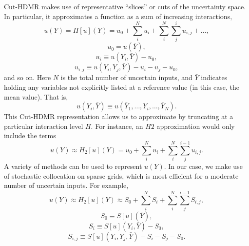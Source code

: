 \documentclass[11pt]{article}
\begin{document}
Cut-HDMR makes use of representative ``slices'' or cuts of the uncertainty space.  In particular, it approximates a function as a sum of increasing interactions,
\begin{equation}
u(Y)= H[u](Y)=u_0 + \sum_i^N u_i + \sum_i^N\sum_j^i u_{i,j}+...,
\end{equation}
\begin{equation}
u_0=u(\bar Y),
\end{equation}
\begin{equation}
u_i\equiv u(Y_i,\bar Y) - u_0,
\end{equation}
\begin{equation}
u_{i,j}\equiv u(Y_i,Y_j,\bar Y) - u_i - u_j - u_0,
\end{equation}
and so on.  Here $N$ is the total number of uncertain inputs, and $\bar Y$ indicates holding any variables not explicitly listed at a reference value (in this case, the mean value).  That is,
\begin{equation}
u(Y_i,\bar Y) \equiv u(\bar Y_1,\ldots,Y_i,\ldots,\bar Y_N).
\end{equation}
This Cut-HDMR representation allows us to approximate by truncating at a particular interaction level $H$.  For instance, an $H2$ approximation would only include the terms
\begin{equation}
u(Y)\approx H_2[u](Y) = u_0 + \sum_i^N u_i + \sum_i^N\sum_j^{i-1} u_{i,j}.
\end{equation}
A variety of methods can be used to represent $u(Y)$.  In our case, we make use of stochastic collocation on sparse grids, which is most efficient for a moderate number of uncertain inputs.  For example,
\begin{equation}
u(Y)\approx H_2[u](Y)\approx S_0 + \sum_i^N S_i + \sum_i^N\sum_j^{i-1} S_{i,j},
\end{equation}
\begin{equation}
S_0\equiv S[u](\bar Y),
\end{equation}
\begin{equation}
S_i\equiv S[u](Y_i,\bar Y) - S_0,
\end{equation}
\begin{equation}
S_{i,j}\equiv S[u](Y_i,Y_j,\bar Y) - S_i - S_j - S_0.
\end{equation}
\end{document}
